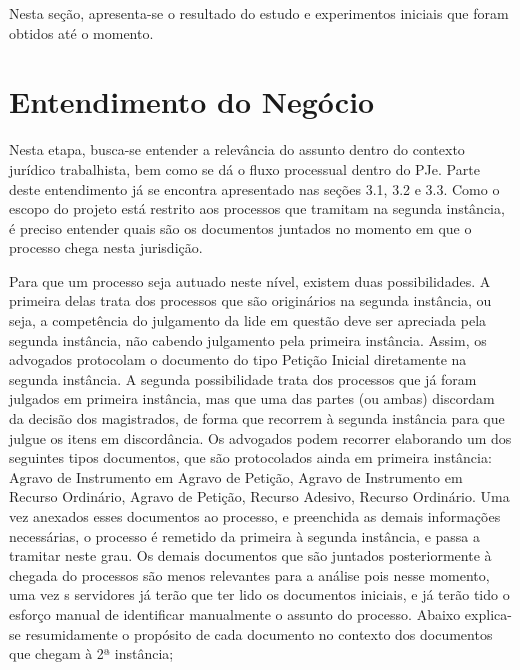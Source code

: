 Nesta seção, apresenta-se o resultado do estudo e experimentos iniciais que foram obtidos até o momento.

\section{Entendimento do Negócio}

Nesta etapa, busca-se entender a relevância do assunto dentro do contexto jurídico trabalhista, bem como se dá o fluxo processual dentro do PJe. Parte deste entendimento já se encontra apresentado nas seções 3.1, 3.2 e 3.3. 
Como o escopo do projeto está restrito aos processos que tramitam na segunda instância, é preciso entender quais são os documentos juntados no momento em que o processo chega nesta jurisdição. 

Para que um processo seja autuado neste nível, existem duas possibilidades. A primeira delas trata dos processos que são originários na segunda instância, ou seja, a competência do julgamento da lide em questão deve ser apreciada pela segunda instância, não cabendo julgamento pela primeira instância. Assim, os advogados protocolam o documento do tipo Petição Inicial diretamente na segunda instância. A segunda possibilidade trata dos processos que já foram julgados em primeira instância, mas que uma das partes (ou ambas) discordam da decisão dos magistrados, de forma que recorrem à segunda instância para que julgue os itens em discordância. Os advogados podem recorrer elaborando um dos seguintes tipos documentos, que são protocolados ainda em primeira instância: Agravo de Instrumento em Agravo de Petição, Agravo de Instrumento em Recurso Ordinário, Agravo de Petição, Recurso Adesivo, Recurso Ordinário. Uma vez anexados esses documentos ao processo, e preenchida as demais informações necessárias, o processo é remetido da primeira à segunda instância, e passa a tramitar neste grau. Os demais documentos que são juntados posteriormente à chegada do processos são menos relevantes para a análise pois nesse momento, uma vez s servidores já terão que ter lido os documentos iniciais, e já terão tido o esforço manual de identificar manualmente o assunto do processo.  Abaixo explica-se resumidamente o propósito de cada documento no contexto dos documentos que chegam à 2ª instância;


